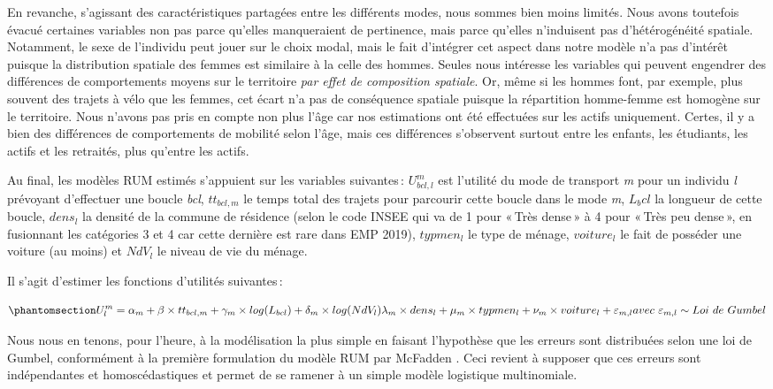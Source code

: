 \documentclass[
  9pt,
  a4paper,
  DIV=11]{scrreprt}
\begin{document}
En revanche, s'agissant des caractéristiques partagées entre les
différents modes, nous sommes bien moins limités. Nous avons toutefois
évacué certaines variables non pas parce qu'elles manqueraient de
pertinence, mais parce qu'elles n'induisent pas d'hétérogénéité
spatiale. Notamment, le sexe de l'individu peut jouer sur le choix
modal, mais le fait d'intégrer cet aspect dans notre modèle n'a pas
d'intérêt puisque la distribution spatiale des femmes est similaire à la
celle des hommes. Seules nous intéresse les variables qui peuvent
engendrer des différences de comportements moyens sur le territoire
\emph{par effet de composition spatiale}. Or, même si les hommes font,
par exemple, plus souvent des trajets à vélo que les femmes, cet écart
n'a pas de conséquence spatiale puisque la répartition homme-femme est
homogène sur le territoire. Nous n'avons pas pris en compte non plus
l'âge car nos estimations ont été effectuées sur les actifs uniquement.
Certes, il y a bien des différences de comportements de mobilité selon
l'âge, mais ces différences s'observent surtout entre les enfants, les
étudiants, les actifs et les retraités, plus qu'entre les actifs.

Au final, les modèles RUM estimés s'appuient sur les variables
suivantes\,: \(U_{bcl,l}^m\) est l'utilité du mode de transport \emph{m}
pour un individu \emph{l} prévoyant d'effectuer une boucle \emph{bcl},
\(tt_{bcl, m}\) le temps total des trajets pour parcourir cette boucle
dans le mode \emph{m}, \(L_bcl\) la longueur de cette boucle, \(dens_l\)
la densité de la commune de résidence (selon le code INSEE qui va de 1
pour «\,Très dense\,» à 4 pour «\,Très peu dense\,», en fusionnant les
catégories 3 et 4 car cette dernière est rare dans EMP 2019),
\(typmen_l\) le type de ménage, \(voiture_l\) le fait de posséder une
voiture (au moins) et \(NdV_l\) le niveau de vie du ménage.

Il s'agit d'estimer les fonctions d'utilités suivantes\,:

\begin{equation}\phantomsection\label{eq-utility}{
U_l^m = \alpha_m + \beta \times tt_{bcl,m} + \gamma_m \times log(L_{bcl}) + \delta_m \times log(NdV_l)
\\ \lambda_m \times dens_l + \mu_m \times typmen_l + \nu_m \times voiture_l + \varepsilon_{m,l}
\\ avec\ \varepsilon_{m,l} \sim Loi\ de\ Gumbel
}\end{equation}

Nous nous en tenons, pour l'heure, à la modélisation la plus simple en
faisant l'hypothèse que les erreurs sont distribuées selon une loi de
Gumbel, conformément à la première formulation du modèle RUM par
McFadden . Ceci revient à supposer que ces erreurs sont indépendantes et
homoscédastiques et permet de se ramener à un simple modèle logistique
multinomiale.
\end{document}
